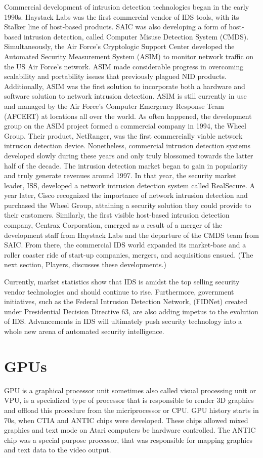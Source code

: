 \documentclass[thesis=M,english]{FITthesis}[2011/07/15]
\begin{document}
Commercial development of intrusion detection technologies began in the early 1990s. Haystack Labs was the first commercial vendor of IDS tools, with its Stalker line of host-based products. SAIC was also developing a form of host-based intrusion detection, called Computer Misuse Detection System (CMDS). Simultaneously, the Air Force's Cryptologic Support Center developed the Automated Security Measurement System (ASIM) to monitor network traffic on the US Air Force's network. ASIM made considerable progress in overcoming scalability and portability issues that previously plagued NID products. Additionally, ASIM was the first solution to incorporate both a hardware and software solution to network intrusion detection. ASIM is still currently in use and managed by the Air Force's Computer Emergency Response Team (AFCERT) at locations all over the world. As often happened, the development group on the ASIM project formed a commercial company in 1994, the Wheel Group. Their product, NetRanger, was the first commercially viable network intrusion detection device. Nonetheless, commercial intrusion detection systems developed slowly during these years and only truly blossomed towards the latter half of the decade.
The intrusion detection market began to gain in popularity and truly generate revenues around 1997. In that year, the security market leader, ISS, developed a network intrusion detection system called RealSecure. A year later, Cisco recognized the importance of network intrusion detection and purchased the Wheel Group, attaining a security solution they could provide to their customers. Similarly, the first visible host-based intrusion detection company, Centrax Corporation, emerged as a result of a merger of the development staff from Haystack Labs and the departure of the CMDS team from SAIC. From there, the commercial IDS world expanded its market-base and a roller coaster ride of start-up companies, mergers, and acquisitions ensued. (The next section, Players, discusses these developments.)

Currently, market statistics show that IDS is amidst the top selling security vendor technologies and should continue to rise. Furthermore, government initiatives, such as the Federal Intrusion Detection Network, (FIDNet) created under Presidential Decision Directive 63, are also adding impetus to the evolution of IDS. Advancements in IDS will ultimately push security technology into a whole new arena of automated security intelligence.

\section{GPUs}
GPU is a graphical processor unit sometimes also called visual processing unit or VPU, is a specialized type of processor that is responsible to render 3D graphics and offload this procedure from the micriprocessor or CPU. GPU history starts in 70s, when CTIA and ANTIC chips were developed. These chips allowed mixed graphics and text mode on Atari computers be hardware controlled. The ANTIC chip was a special purpose processor, that was responsible for mapping graphics and text data to the video output.
\end{document}
